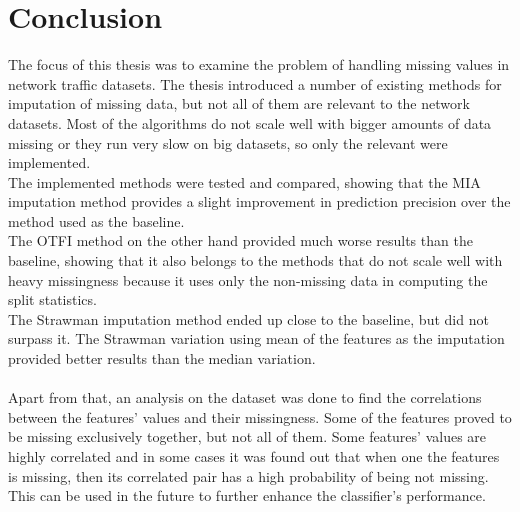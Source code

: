 \documentclass[11pt]{article}
\begin{document}
  \section*{Conclusion}
    The focus of this thesis was to examine the problem of handling missing values in network traffic datasets. The thesis introduced a number of existing methods for imputation of missing data, but not all of them are relevant to the network datasets. Most of the algorithms do not scale well with bigger amounts of data missing or they run very slow on big datasets, so only the relevant were implemented.
    \\
    The implemented methods were tested and compared, showing that the MIA imputation method provides a slight improvement in prediction precision over the method used as the baseline.
    \\
    The OTFI method on the other hand provided much worse results than the baseline, showing that it also belongs to the methods that do not scale well with heavy missingness because it uses only the non-missing data in computing the split statistics.
    \\
    The Strawman imputation method ended up close to the baseline, but did not surpass it. The Strawman variation using mean of the features as the imputation provided better results than the median variation.
    \\~\\
    Apart from that, an analysis on the dataset was done to find the correlations between the features' values and their missingness. Some of the features proved to be missing exclusively together, but not all of them. Some features' values are highly correlated and in some cases it was found out that when one the features is missing, then its correlated pair has a high probability of being not missing. This can be used in the future to further enhance the classifier's performance.
  \newpage
  
\end{document}
